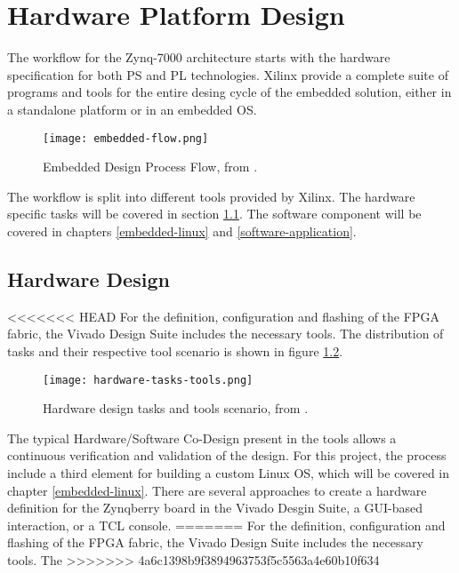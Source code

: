 
\chapter{Hardware Platform Design}

The workflow for the Zynq-7000 architecture starts with the hardware specification for both PS and PL technologies. Xilinx provide a complete suite of programs and tools for the entire desing cycle of the embedded solution, either in a standalone platform or in an embedded OS.

\begin{figure}[htp]
	\centering
	\texttt{[image: embedded-flow.png]}
	\caption{Embedded Design Process Flow, from \cite{UG1043}.} \label{fig:embedded-flow}
\end{figure}%

The workflow is split into different tools provided by Xilinx. The hardware specific tasks will be covered in section \ref{hardware-design}. The software component will be covered in chapters \ref{embedded-linux} and \ref{software-application}.

\section{Hardware Design} \label{hardware-design}

<<<<<<< HEAD
For the definition, configuration and flashing of the FPGA fabric, the Vivado Design Suite includes the necessary tools. The distribution of tasks and their respective tool scenario is shown in figure \ref{fig:hardware-tasks-tools}.

\begin{figure}[htp]
	\centering
	\texttt{[image: hardware-tasks-tools.png]}
	\caption{Hardware design tasks and tools scenario, from \cite{UG1043}.} \label{fig:hardware-tasks-tools}
\end{figure}%

The typical Hardware/Software Co-Design present in the tools allows a continuous verification and validation of the design. For this project, the process include a third element for building a custom Linux OS, which will be covered in chapter \ref{embedded-linux}. There are several approaches to create a hardware definition for the Zynqberry board in the Vivado Desgin Suite, a GUI-based interaction, or a TCL console.
=======
For the definition, configuration and flashing of the FPGA fabric, the Vivado Design Suite includes the necessary tools. The 
>>>>>>> 4a6c1398b9f3894963753f5c5563a4e60b10f634

